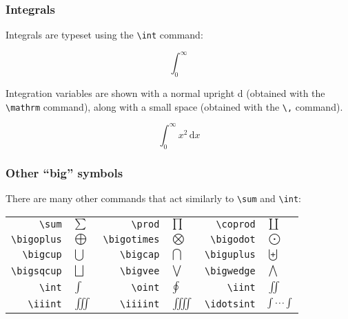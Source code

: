 \documentclass[mathserif]{beamer}
\begin{document}
\begin{frame}[fragile]
\frametitle{Integrals}
\vfill
Integrals are typeset using the \texttt{{\textbackslash}int} command:
\vfill
	\begin{LTXexample}[style=latexsty]
		\[ \int_0^\infty \]
	\end{LTXexample}
\vfill
Integration variables are shown with a normal upright d (obtained with the \texttt{{\textbackslash}mathrm} command), along with a small space (obtained with the \texttt{{\textbackslash},} command).
\vfill
	\begin{LTXexample}[style=latexsty]
		\[ \int_0^\infty x^2\,\mathrm{d}x\]
	\end{LTXexample}
\vfill
\end{frame}

\begin{frame}[fragile]
\frametitle{Other ``big'' symbols}
\vfill
There are many other commands that act similarly to \texttt{{\textbackslash}sum} and \texttt{{\textbackslash}int}:
\vfill
\begin{center}
\begin{tabular}{r | l | r | l | r | l}
	\texttt{{\textbackslash}sum} & $\sum$ & \texttt{{\textbackslash}prod} & $\prod$ & \texttt{{\textbackslash}coprod} & $\coprod$ \\
	\texttt{{\textbackslash}bigoplus} & $\bigoplus$ & \texttt{{\textbackslash}bigotimes} & $\bigotimes$ & \texttt{{\textbackslash}bigodot} & $\bigodot$  \\
	\texttt{{\textbackslash}bigcup} & $\bigcup$ & \texttt{{\textbackslash}bigcap} & $\bigcap$ & \texttt{{\textbackslash}biguplus} & $\biguplus$  \\
	\texttt{{\textbackslash}bigsqcup} & $\bigsqcup$ & \texttt{{\textbackslash}bigvee} & $\bigvee$ & \texttt{{\textbackslash}bigwedge} & $\bigwedge$  \\
	\texttt{{\textbackslash}int} & $\int$ & \texttt{{\textbackslash}oint} & $\oint$ & \texttt{{\textbackslash}iint} & $\iint$  \\
	\texttt{{\textbackslash}iiint} & $\iiint$ & \texttt{{\textbackslash}iiiint} & $\iiiint$ & \texttt{{\textbackslash}idotsint} & $\idotsint$  \\
\end{tabular}
\end{center}
\vfill
\end{frame}
\end{document}
